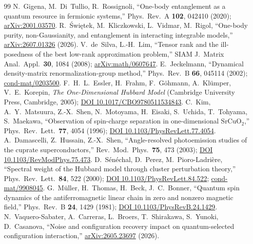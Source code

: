 \begin{thebibliography}{99}
 N.~Gigena, M.~Di~Tullio, R.~Rossignoli, ``One-body entanglement as a quantum resource in fermionic systems,'' Phys.\ Rev.\ A \textbf{102}, 042410 (2020); \href{https://arxiv.org/abs/2001.03570}{arXiv:2001.03570}.
 R.~\'Swi\k{e}tek, M.~Kliczkowski, L.~Vidmar, M.~Rigol, ``One-body purity, non-Gaussianity, and entanglement in interacting integrable models,'' \href{https://arxiv.org/abs/2607.01326}{arXiv:2607.01326} (2026).
 V.~de~Silva, L.-H.~Lim, ``Tensor rank and the ill-posedness of the best low-rank approximation problem,'' SIAM J.\ Matrix Anal.\ Appl.\ \textbf{30}, 1084 (2008); \href{https://arxiv.org/abs/math/0607647}{arXiv:math/0607647}.
 E.~Jeckelmann, ``Dynamical density-matrix renormalization-group method,'' Phys.\ Rev.\ B \textbf{66}, 045114 (2002); \href{https://arxiv.org/abs/cond-mat/0203500}{cond-mat/0203500}.
 F.~H.~L.~Essler, H.~Frahm, F.~G\"ohmann, A.~Kl\"umper, V.~E.~Korepin, \emph{The One-Dimensional Hubbard Model} (Cambridge University Press, Cambridge, 2005); \href{https://doi.org/10.1017/CBO9780511534843}{DOI 10.1017/CBO9780511534843}.
 C.~Kim, A.~Y.~Matsuura, Z.-X.~Shen, N.~Motoyama, H.~Eisaki, S.~Uchida, T.~Tohyama, S.~Maekawa, ``Observation of spin-charge separation in one-dimensional $\mathrm{SrCuO_2}$,'' Phys.\ Rev.\ Lett.\ \textbf{77}, 4054 (1996); \href{https://doi.org/10.1103/PhysRevLett.77.4054}{DOI 10.1103/PhysRevLett.77.4054}.
 A.~Damascelli, Z.~Hussain, Z.-X.~Shen, ``Angle-resolved photoemission studies of the cuprate superconductors,'' Rev.\ Mod.\ Phys.\ \textbf{75}, 473 (2003); \href{https://doi.org/10.1103/RevModPhys.75.473}{DOI 10.1103/RevModPhys.75.473}.
 D.~S\'en\'echal, D.~Perez, M.~Pioro-Ladri\`ere, ``Spectral weight of the Hubbard model through cluster perturbation theory,'' Phys.\ Rev.\ Lett.\ \textbf{84}, 522 (2000); \href{https://doi.org/10.1103/PhysRevLett.84.522}{DOI 10.1103/PhysRevLett.84.522}; \href{https://arxiv.org/abs/cond-mat/9908045}{cond-mat/9908045}.
 G.~M\"uller, H.~Thomas, H.~Beck, J.~C.~Bonner, ``Quantum spin dynamics of the antiferromagnetic linear chain in zero and nonzero magnetic field,'' Phys.\ Rev.\ B \textbf{24}, 1429 (1981); \href{https://doi.org/10.1103/PhysRevB.24.1429}{DOI 10.1103/PhysRevB.24.1429}.
 N.~Vaquero-Sabater, A.~Carreras, L.~Broers, T.~Shirakawa, S.~Yunoki, D.~Casanova, ``Noise and configuration recovery impact on quantum-selected configuration interaction,'' \href{https://arxiv.org/abs/2605.23697}{arXiv:2605.23697} (2026).

\end{thebibliography}
